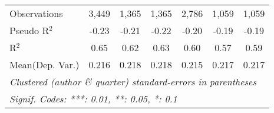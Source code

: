 \begin{tabular}{lcccccc}
   Observations            & 3,449   & 1,365   & 1,365   & 2,786   & 1,059   & 1,059\\  
   Pseudo R$^2$            & -0.23   & -0.21   & -0.22   & -0.20   & -0.19   & -0.19\\  
   R$^2$                   & 0.65    & 0.62    & 0.63    & 0.60    & 0.57    & 0.59\\  
Mean(Dep. Var.) & 0.216 & 0.218 & 0.218 & 0.215 & 0.217 & 0.217 \\
   \midrule \midrule
   \multicolumn{7}{l}{\emph{Clustered (author \& quarter) standard-errors in parentheses}}\\
   \multicolumn{7}{l}{\emph{Signif. Codes: ***: 0.01, **: 0.05, *: 0.1}}\\
\end{tabular}
\par\endgroup
